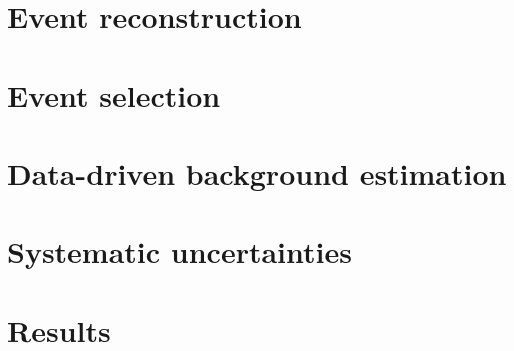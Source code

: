 \section{Event reconstruction}

\section{Event selection}

\section{Data-driven background estimation}

\section{Systematic uncertainties}

\section{Results}


